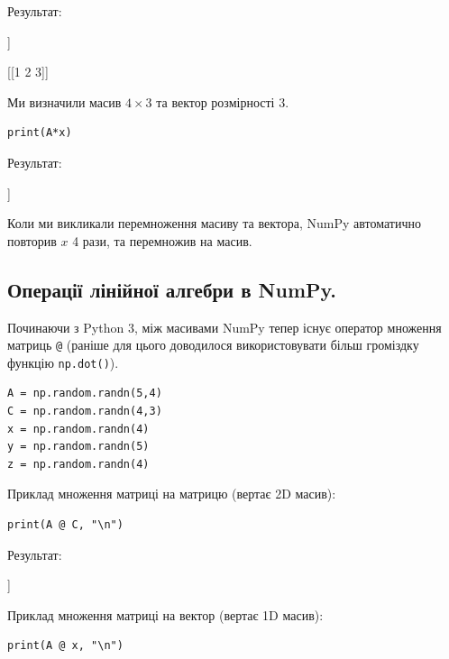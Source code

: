 Результат:

\begin{console}
[[1. 1. 1.]
 [1. 1. 1.]
 [1. 1. 1.]
 [1. 1. 1.]] 

[[1 2 3]] 
\end{console}

Ми визначили масив $4\times 3$ та вектор розмірності $3$. 


\begin{lstlisting}
print(A*x)
\end{lstlisting}

Результат:

\begin{console}
[[1. 2. 3.]
 [1. 2. 3.]
 [1. 2. 3.]
 [1. 2. 3.]]
\end{console}

Коли ми викликали перемноження масиву та вектора, NumPy автоматично повторив $x$ 4 рази, та перемножив на масив.


\subsection{Операції лінійної алгебри в NumPy.}

Починаючи з Python 3, між масивами NumPy тепер існує оператор множення матриць \verb|@| (раніше для цього доводилося використовувати більш громіздку функцію \verb|np.dot()|).

\begin{lstlisting}
A = np.random.randn(5,4)
C = np.random.randn(4,3)
x = np.random.randn(4)
y = np.random.randn(5)
z = np.random.randn(4)
\end{lstlisting}

Приклад множення матриці на матрицю (вертає 2D масив):

\begin{lstlisting}
print(A @ C, "\n") 
\end{lstlisting}

Результат:

\begin{console}
[[-0.77983164  0.86915701  0.74016041]
 [ 0.9441811  -1.13337787 -2.45126146]
 [ 1.06065113 -3.17950771 -3.50084458]
 [ 1.26732128 -1.3041138  -2.5499486 ]
 [ 1.60891994 -4.68541868 -4.6433185 ]] 
\end{console}


Приклад множення матриці на вектор (вертає 1D масив):

\begin{lstlisting}
print(A @ x, "\n")
\end{lstlisting}

